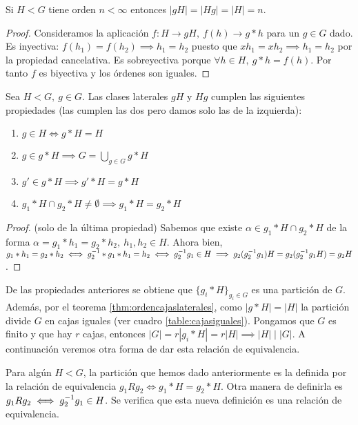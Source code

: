 \begin{thm}
	\label{thm:ordencajaslaterales}
	Si $H < G$ tiene orden $n < \infty$ entonces $|gH| = |Hg| = |H| = n$.
\end{thm}

\begin{proof}
	Consideramos la aplicación $f: H \to gH,\ f(h) \to g\ast h$ para un $g \in G$ dado. Es inyectiva: $f(h_1) = f(h_2) \implies h_1 = h_2$ puesto que $xh_1 = xh_2 \implies h_1 = h_2$ por la propiedad cancelativa. Es sobreyectiva porque $\forall h \in H,\ g \ast h = f(h)$. Por tanto $f$ es biyectiva y los órdenes son iguales.
\end{proof}

\begin{pro}
	Sea $H < G,\ g \in G$. Las clases laterales $gH$ y $Hg$ cumplen las siguientes propiedades (las cumplen las dos pero damos solo las de la izquierda):
	\begin{enumerate}
		\item $g \in H \iff g\ast H = H$
		\item $g \in g \ast H \implies G = \bigcup_{g \in G} g \ast H$
		\item $g' \in g \ast H \implies g' \ast H = g \ast H$
		\item $g_1 \ast H \cap g_2 \ast H \neq \emptyset \implies g_1 \ast H = g_2 \ast H$
	\end{enumerate}
\end{pro}

\begin{proof}
	(solo de la última propiedad)
	Sabemos que existe $\alpha \in g_1 \ast H \cap g_2 \ast H$ de la forma $\alpha = g_1 \ast h_1 = g_2 \ast h_2,\ h_1, h_2 \in H$. Ahora bien, $g_1 \ast h_1 = g_2 \ast h_2 \iff g_2^{-1} \ast g_1 \ast h_1 = h_2 \iff g_2^{-1}g_1 \in H \implies g_2(g_2^{-1}g_1)H = g_2(g_2^{-1}g_1H) = g_2 H$.
\end{proof}

De las propiedades anteriores se obtiene que $\{g_i \ast H\}_{g_i \in G}$ es una partición de $G$. Además, por el teorema \ref{thm:ordencajaslaterales}, como $|g \ast H| = |H|$ la partición divide $G$ en cajas iguales (ver cuadro \ref{table:cajasiguales}). Pongamos que $G$ es finito y que hay $r$ cajas, entonces $|G| = r|g_i \ast H| = r|H| \implies |H| \mid |G|$. A continuación veremos otra forma de dar esta relación de equivalencia.


Para algún $H < G$, la partición que hemos dado anteriormente es la definida por la relación de equivalencia $g_1 R g_2 \iff g_1 \ast H = g_2 \ast H$. Otra manera de definirla es $g_1 R g_2 \iff g_2^{-1}g_1 \in H$. Se verifica que esta nueva definición es una relación de equivalencia.

